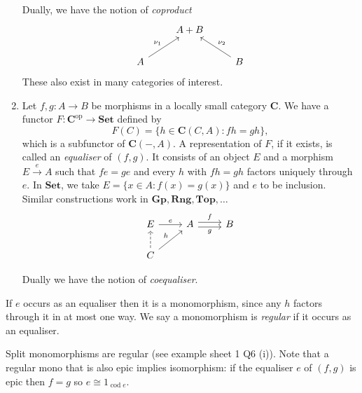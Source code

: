 \documentclass[a4paper]{article}
\renewcommand{\c}[1]{\mathbf{#1}}
\DeclareMathOperator{\cod}{cod}
\newcommand{\Set}{{\c{Set}}}
\newcommand{\Top}{{\c{Top}}}
\begin{document}
\begin{eg}
\begin{enumerate}
    Dually, we have the notion of \emph{coproduct}
    \[
      \begin{tikzcd}
        & A + B \\
        A \ar[ur, "\nu_1"] & & B \ar[ul, "\nu_2"']
      \end{tikzcd}
    \]
    These also exist in many categories of interest.
  \item Let \(f, g: A \to B\) be morphisms in a locally small category \(\c C\). We have a functor \(F: \c C^{\text{op}} \to \Set\) defined by
    \[
      F(C) = \{h \in \c C(C, A): fh = gh\},
    \]
    which is a subfunctor of \(\c C(-, A)\). A representation of \(F\), if it exists, is called an \emph{equaliser} of \((f, g)\). It consists of an object \(E\) and a morphism \(E \xrightarrow{e} A\) such that \(fe = ge\) and every \(h\) with \(fh = gh\) factors uniquely through \(e\). In \(\Set\), we take \(E = \{x \in A: f(x) = g(x)\}\) and \(e\) to be inclusion. Similar constructions work in \(\c{Gp}, \c{Rng}, \Top, \dots\)
    \[
      \begin{tikzcd}
        E \ar[r, "e"] & A \ar[r, "f", shift left] \ar[r, "g"', shift right] & B \\
        C \ar[u, dashed] \ar[ur, "h"]
      \end{tikzcd}
    \]

    Dually we have the notion of \emph{coequaliser}.
  \end{enumerate}
\end{eg}

\begin{remark}
  If \(e\) occurs as an equaliser then it is a monomorphism, since any \(h\) factors through it in at most one way. We say a monomorphism is \emph{regular} if it occurs as an equaliser.

  Split monomorphisms are regular (see example sheet 1 Q6 (i)). Note that a regular mono that is also epic implies isomorphism: if the equaliser \(e\) of \((f, g)\) is epic then \(f = g\) so \(e \cong 1_{\cod e}\).
\end{remark}
\end{document}
